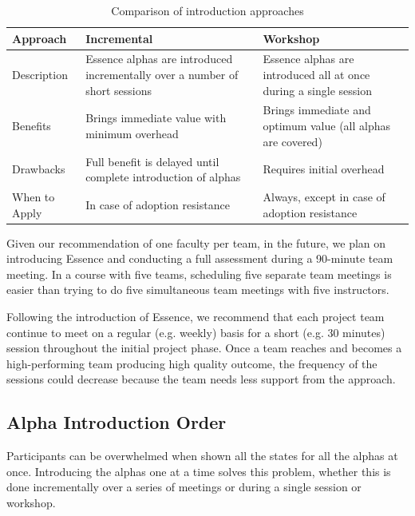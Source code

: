 \begin{table}[]
\centering
\renewcommand{\arraystretch}{1.4}
\caption{Comparison of introduction approaches}
\label{ComparingWorkshopAppoaches}
\begin{tabular}{|p{0.6in}|p{1.1in}|p{1.1in}|}
\hline
Approach      & Incremental                                                                 & Workshop  \\
\hline
Description   & Essence alphas are introduced incrementally over a number of short sessions & Essence alphas are introduced all at once during a single session \\
\hline
Benefits      & Brings immediate value with minimum overhead                                & Brings immediate and optimum value (all alphas are covered)       \\
\hline
Drawbacks     & Full benefit is delayed until complete introduction of alphas               & Requires initial overhead                                         \\
\hline
When to Apply & In case of adoption resistance                                              & Always, except in case of adoption resistance  \\                  
\hline
\end{tabular}
\end{table}

Given our recommendation of one faculty per team, in the future, we plan on introducing Essence and conducting a full assessment during a 90-minute team meeting. In a course with five teams, scheduling five separate team meetings is easier than trying to do five simultaneous team meetings with five instructors.

Following the introduction of Essence, we recommend that each project team continue to meet on a regular (e.g. weekly) basis for a short (e.g. 30 minutes) session throughout the initial project phase. Once a team reaches  and becomes a high-performing team producing high quality outcome, the frequency of the sessions could decrease because the team needs less support from the approach.

\subsection{Alpha Introduction Order}
Participants can be overwhelmed when shown all the states for all the alphas at once. Introducing the alphas one at a time solves this problem, whether this is done incrementally over a series of meetings or during a single session or workshop.


